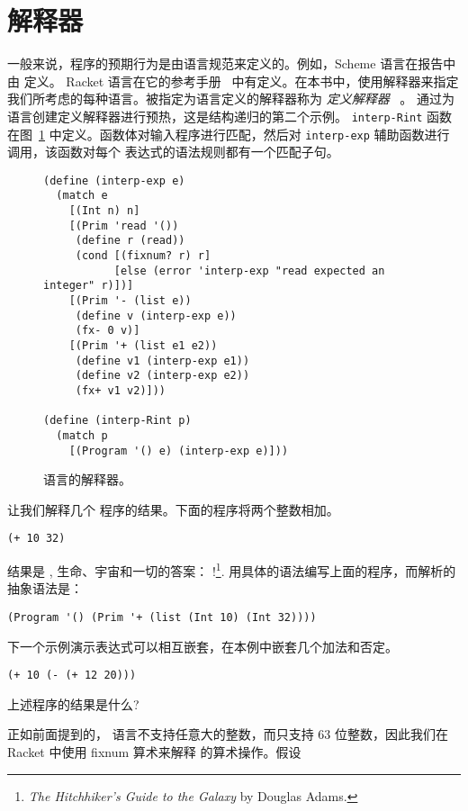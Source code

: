 \documentclass[11pt]{book}
\begin{document}
\section{解释器}
\label{sec:interp-Rint}

一般来说，程序的预期行为是由语言规范来定义的。例如，Scheme 语言在报告中由 \cite{SPERBER:2009aa} 定义。 Racket 语言在它的参考手册~\citep{plt-tr} 中有定义。在本书中，使用解释器来指定我们所考虑的每种语言。被指定为语言定义的解释器称为
\emph{定义解释器}~\citep{reynolds72:_def_interp} 。
 通过为 \LangInt{} 语言创建定义解释器进行预热，这是结构递归的第二个示例。 \texttt{interp-Rint} 函数在图~\ref{fig:interp-Rint} 中定义。函数体对输入程序进行匹配，然后对 \lstinline{interp-exp} 辅助函数进行调用，该函数对每个
\LangInt{} 表达式的语法规则都有一个匹配子句。

\begin{figure}[tp]
\begin{lstlisting}
(define (interp-exp e)
  (match e
    [(Int n) n]
    [(Prim 'read '())
     (define r (read))
     (cond [(fixnum? r) r]
           [else (error 'interp-exp "read expected an integer" r)])]
    [(Prim '- (list e))
     (define v (interp-exp e))
     (fx- 0 v)]
    [(Prim '+ (list e1 e2))
     (define v1 (interp-exp e1))
     (define v2 (interp-exp e2))
     (fx+ v1 v2)]))

(define (interp-Rint p)
  (match p
    [(Program '() e) (interp-exp e)]))
\end{lstlisting}
\caption{ \LangInt{} 语言的解释器。}
\label{fig:interp-Rint}
\end{figure}

让我们解释几个 \LangInt{} 程序的结果。下面的程序将两个整数相加。
\begin{lstlisting}
(+ 10 32)
\end{lstlisting}
结果是  , 生命、宇宙和一切的答案： !\footnote{\emph{The Hitchhiker's Guide to the
    Galaxy} by Douglas Adams.}.
%
用具体的语法编写上面的程序，而解析的抽象语法是：
\begin{lstlisting}
(Program '() (Prim '+ (list (Int 10) (Int 32))))
\end{lstlisting}

下一个示例演示表达式可以相互嵌套，在本例中嵌套几个加法和否定。
\begin{lstlisting}
(+ 10 (- (+ 12 20)))
\end{lstlisting}
上述程序的结果是什么?

正如前面提到的， \LangInt{} 语言不支持任意大的整数，而只支持 $63$ 位整数，因此我们在 Racket 中使用 fixnum 算术来解释 \LangInt{} 的算术操作。假设
\end{document}
